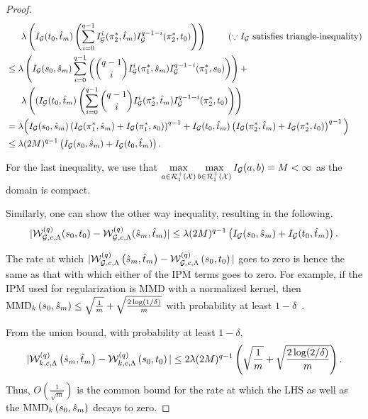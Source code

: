 \begin{proof}
\begin{align*}
    &~~\quad \lambda \left (  I_\calG(t_0,\hat{t}_m)\left(\sum_{i=0}^{q-1} I^i_\calG(\pi^*_2,\hat{t}_m) I^{q-1-i}_\calG(\pi^*_2,t_0)\right) \right)  \ \tag{$\because I_\calG$  satisfies triangle-inequality}
    \\
    &\le \lambda \left(  I_\calG(s_0,\hat{s}_m) \sum_{i=0}^{q-1} \left(\binom{q-1}{i} I^i_\calG(\pi^*_1,\hat{s}_m) I^{q-1-i}_\calG(\pi^*_1,s_0) \right)\right) +\\
    &~~\quad \lambda \left ( ( I_\calG(t_0,\hat{t}_m)\left(\sum_{i=0}^{q-1} \binom{q-1}{i} I^i_\calG(\pi^*_2,\hat{t}_m) I^{q-1-i}_\calG(\pi^*_2,t_0)\right) \right)\\
    &= \lambda \Big(  I_\calG(s_0,\hat{s}_m) \left(  I_\calG(\pi^*_1, \hat{s}_m) +  I_\calG(\pi^*_1, s_0) \right)^{q-1} +  I_\calG(t_0,\hat{t}_m) \left(  I_\calG(\pi^*_2, \hat{t}_m) +  I_\calG(\pi^*_2, t_0) \right)^{q-1}
    \Big)\\
    &\leq \lambda (2M)^{q-1} \left( I_\calG(s_0,\hat{s}_m)  +  I_\calG(t_0,\hat{t}_m)\right).
\end{align*}
\endgroup

For the last inequality, we use that $\max\limits_{a\in \mathcal{R}_1^+(\mathcal{X})}\max\limits_{b\in \mathcal{R}_1^+(\mathcal{X})} I_{\mathcal{G}}(a, b)= M <\infty$ as the domain is compact.

Similarly, one can show the other way inequality, resulting in the following.
\begin{align}
    |\mathcal{W}_{\mathcal{G}, c, \Lambda}^{(q)}(s_0, t_0)-\mathcal{W}_{\mathcal{G}, c, \Lambda}^{(q)}(\hat{s}_m, \hat{t}_m)|\leq \lambda (2M)^{q-1} \left( I_{\mathcal{G}}(s_0,\hat{s}_m)  +  I_{\mathcal{G}}(t_0,\hat{t}_m)\right).
\end{align}


The rate at which $|\mathcal{W}_{\mathcal{G}, c, \Lambda}^{(q)}\left(\hat{s}_m,\hat{t}_m\right)-\mathcal{W}_{\mathcal{G}, c, \Lambda}^{(q)}\left(s_0,t_0\right)|$ goes to zero is hence the same as that with which either of the IPM terms goes to zero.
For example, if the IPM used for regularization is MMD with a normalized kernel, then $\textup{MMD}_k\left(s_0,\hat{s}_m\right)\le \sqrt{\frac{1}{m}}+\sqrt{\frac{2\log(1/\delta)}{m}}$ with probability at least $1-\delta$~\citep{SmolaGSS07}. 

From the union bound, with probability at least $1-\delta$, $$|\mathcal{W}_{k, c, \Lambda}^{(q)}\left(\hat{s}_m,\hat{t}_m\right)-\mathcal{W}_{k, c, \Lambda}^{(q)}\left(s_0,t_0\right)|\le 2\lambda(2M)^{q-1}\left(\sqrt{\frac{1}{m}}+\sqrt{\frac{2\log(2/\delta)}{m}}\right).$$ Thus, $O\left(\frac{1}{\sqrt{m}}\right)$ is the common bound for the rate at which the LHS as well as the $\textup{MMD}_k\left(s_0,\hat{s}_m\right)$ decays to zero.
\end{proof}

